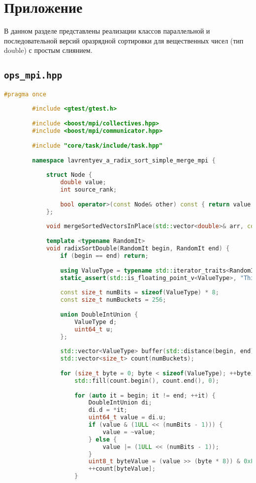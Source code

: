 \documentclass[12pt]{article}
\begin{document}
	\appendix
	\newpage
	\section*{Приложение}
	
	В данном разделе представлены реализации классов параллельной и последовательной версий оразрядной сортировки для вещественных чисел (тип double) с простым слиянием.
	
	
	\subsection*{\texttt{ops\_mpi.hpp}}
	
	\begin{lstlisting}[language=C++]
		#pragma once
		
		#include <gtest/gtest.h>
		
		#include <boost/mpi/collectives.hpp>
		#include <boost/mpi/communicator.hpp>
		
		#include "core/task/include/task.hpp"
		
		namespace lavrentyev_a_radix_sort_simple_merge_mpi {
			
			struct Node {
				double value;
				int source_rank;
				
				bool operator>(const Node& other) const { return value > other.value; }
			};
			
			void mergeSortedVectorsInPlace(std::vector<double>& arr, const std::vector<int>& sizes, const std::vector<int>& displs);
			
			template <typename RandomIt>
			void radixSortDouble(RandomIt begin, RandomIt end) {
				if (begin == end) return;
				
				using ValueType = typename std::iterator_traits<RandomIt>::value_type;
				static_assert(std::is_floating_point_v<ValueType>, "This function is designed for floating-point types.");
				
				const size_t numBits = sizeof(ValueType) * 8;
				const size_t numBuckets = 256;
				
				union DoubleIntUnion {
					ValueType d;
					uint64_t u;
				};
				
				std::vector<ValueType> buffer(std::distance(begin, end));
				std::vector<size_t> count(numBuckets);
				
				for (size_t byte = 0; byte < sizeof(ValueType); ++byte) {
					std::fill(count.begin(), count.end(), 0);
					
					for (auto it = begin; it != end; ++it) {
						DoubleIntUnion di;
						di.d = *it;
						uint64_t value = di.u;
						if (value & (1ULL << (numBits - 1))) {
							value = ~value;
						} else {
							value |= (1ULL << (numBits - 1));
						}
						uint8_t byteValue = (value >> (byte * 8)) & 0xFF;
						++count[byteValue];
					}
					

\end{lstlisting}
\end{document}
